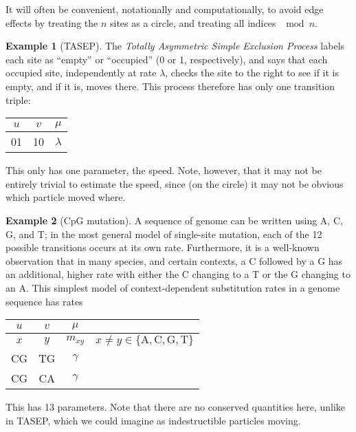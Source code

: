 \documentclass{article}
\newcommand{\nA}{\mbox{A}}  %
\newcommand{\nC}{\mbox{C}}
\newcommand{\nG}{\mbox{G}}
\newcommand{\nT}{\mbox{T}}
\theoremstyle{definition}
\newtheorem{example}{Example}[section]
\begin{document}
It will often be convenient, notationally and computationally, to avoid edge effects
by treating the $n$ sites as a circle, and treating all indices $\mod n$.

\begin{example}[TASEP]
  The \emph{Totally Asymmetric Simple Exclusion Process} labels each site as ``empty'' or ``occupied'' (0 or 1, respectively), 
  and says that each occupied site, independently at rate $\lambda$, checks the site to the right to see if it is empty,
  and if it is, moves there.  
  This process therefore has only one transition triple:

  \begin{center}
    \begin{tabular}{c@{\quad$\to$\quad}c@{\quad at rate\quad }c}
      $u$  &  $v$  &  $\mu$  \\
      \hline
      01  &   10   &  $\lambda$
    \end{tabular}
  \end{center}

  This only has one parameter, the speed.  
  Note, however, that it may not be entirely trivial to estimate the speed,
  since (on the circle) it may not be obvious which particle moved where.

\end{example}

\begin{example}[CpG mutation]
  A sequence of genome can be written using A, C, G, and T;
  in the most general model of single-site mutation, each of the 12 possible transitions occurs at its own rate.
  Furthermore, it is a well-known observation that in many species, and certain contexts, 
  a C followed by a G has an additional, higher rate with either the C changing to a T or the G changing to an A.
  This simplest model of context-dependent substitution rates in a genome sequence has rates

  \begin{center}
    \begin{tabular}{c@{\quad$\to$\quad}c@{\quad at rate\quad }cc}
      $u$  &  $v$  &  $\mu$  & \\
      \hline
      $x$  &  $y$  &  $m_{xy}$ & \qquad $x \neq y \in \{\nA,\nC,\nG,\nT\}$  \\
      CG   &  TG   &  $\gamma$ & \\
      CG   &  CA   &  $\gamma$ &  
    \end{tabular}
  \end{center}

  This has 13 parameters.
  Note that there are no conserved quantities here, unlike in TASEP,
  which we could imagine as indestructible particles moving.


\end{example}
\end{document}
